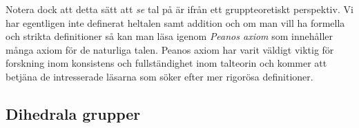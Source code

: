 \documentclass{article}
\theoremstyle{definition}
\begin{document}
Notera dock att detta sätt att \textit{se} tal på är ifrån ett gruppteoretiskt perspektiv. 
Vi har egentligen inte definerat heltalen samt addition och om man vill ha formella och strikta definitioner så kan man läsa igenom \textit{Peanos axiom} som 
innehåller många axiom för de naturliga talen. 
Peanos axiom har varit väldigt viktig 
för forskning inom konsistens och fullständighet inom talteorin och kommer att betjäna 
de intresserade läsarna som söker efter mer rigorösa definitioner.


\subsection{Dihedrala grupper}
\end{document}

